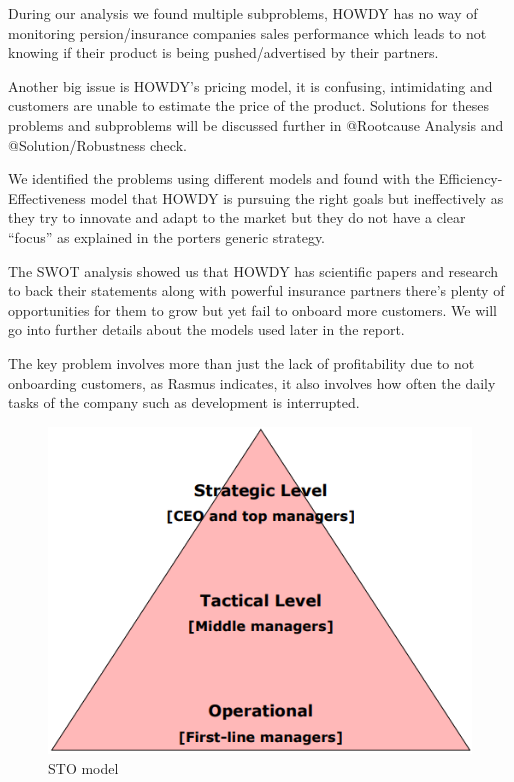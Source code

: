 During our analysis we found multiple subproblems, HOWDY has no way of monitoring persion/insurance companies sales performance which leads to not knowing if their product is being pushed/advertised by their partners.

Another big issue is HOWDY’s pricing model, it is confusing, intimidating and customers are unable to estimate the price of the product. Solutions for theses problems and subproblems will be discussed further in @Rootcause Analysis and @Solution/Robustness check.\newline

\noindent We identified the problems using different models and found with the Efficiency-Effectiveness model that HOWDY is pursuing the right goals but ineffectively as they try to innovate and adapt to the market but they do not have a clear “focus” as explained in the porters generic strategy. 

The SWOT analysis showed us that HOWDY has scientific papers and research to back their statements along with powerful insurance partners there’s plenty of opportunities for them to grow but yet fail to onboard more customers. We will go into further details about the models used later in the report.



The key problem involves more than just the lack of profitability due to not onboarding customers, as Rasmus
indicates, it also involves how often the daily tasks of the company such as development is interrupted.\newline

\begin{figure}
\centering
\includegraphics[scale=0.3]{figures/strategicallevel.png}
\caption{STO model}
\end{figure}

